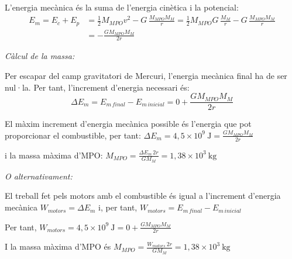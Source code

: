 \begin{solapartat}
 L'energia mecànica és la suma de l'energia cinètica i la potencial:
\begin{align*}
E_m = E_c + E_p &= \frac{1}{2} M_{MPO} v^2 - G\,\frac{M_{MPO} M_M}{r} = \frac{1}{2} M_{MPO} G\,\frac{M_M}{r} - G\,\frac{M_{MPO} M_M}{r}\\
&= -\frac{G M_{MPO} M_M}{2r}
\end{align*}

\textit{Càlcul de la massa:}

 Per escapar del camp gravitatori de Mercuri, l'energia mecànica final ha de ser nul·la. Per tant, l'increment d'energia necessari és:
\[ \Delta E_m = E_{m\,final} - E_{m\,inicial} = 0 + \frac{G M_{MPO} M_M}{2r} \]

 El màxim increment d'energia mecànica possible és l'energia que pot proporcionar el combustible, per tant: $\Delta E_m = 4,5\times 10^{9}\ \mathrm{J} = \frac{G M_{MPO} M_M}{2r}$

i la massa màxima d'MPO: $M_{MPO} = \frac{\Delta E_m\, 2r}{G M_M} = 1,38\times 10^{3}\ \mathrm{kg}$

\textit{O alternativament:}

 El treball fet pels motors amb el combustible és igual a l'increment d'energia mecànica $W_{motors} = \Delta E_m$ i, per tant, $W_{motors} = E_{m\,final} - E_{m\,inicial}$

 Per tant, $W_{motors} = 4,5\times 10^{9}\ \mathrm{J} = 0 + \frac{G M_{MPO} M_M}{2r}$

I la massa màxima d'MPO és $M_{MPO} = \frac{W_{motors}\, 2r}{G M_M} = 1,38\times 10^{3}\ \mathrm{kg}$
\end{solapartat}
